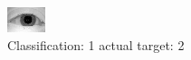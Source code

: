 \begin{figure}[h!]
\begin{center}
\includegraphics[width=0.60\columnwidth]{figures/ID892_class_1_target_2.png}
\end{center}
\caption{ Classification: 1 actual target: 2}
\label{fig:ID892_class_1_target_2}
\end{figure}
